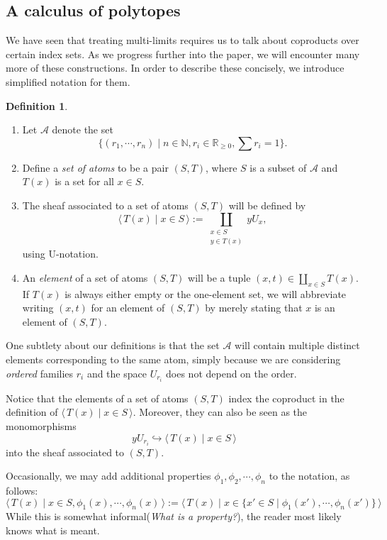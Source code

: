 \documentclass[a4paper]{amsproc}
\theoremstyle{plain}
\theoremstyle{definition}
\newtheorem{definition}[theorem]{Definition}
\theoremstyle{remark}
\numberwithin{equation}{section}
\newcommand{\y}{\textit{y}}
\newcommand{\la}{\langle\,}
\newcommand{\ra}{\,\rangle}
\begin{document}
\subsection{A calculus of polytopes}

We have seen that treating multi-limits requires us to talk about coproducts over certain index sets. As we progress further into the paper, we will encounter many more of these constructions. In order to describe these concisely, we introduce simplified notation for them.

\begin{definition}
    \mbox{}
    \begin{enumerate}
        \item Let $\mathcal{A}$ denote the set
        \[
            \{(r_1,\cdots, r_n) \mid n \in \mathbb{N}, r_i \in \mathbb{R}_{\geq 0}, \sum r_i = 1\}.
        \]
        \item Define a \emph{set of atoms} to be a pair $(S, T)$, where $S$ is a subset of $\mathcal{A}$ and $T(x)$ is a set for all $x \in S$.
        \item The sheaf associated to a set of atoms $(S,T)$ will be defined by
        \[
            \la T(x) \mid x \in S \ra := \coprod_{\substack{x \in S \\ y \in T(x)}} \y U_x ,
        \]
        using U-notation.
        \item An \emph{element} of a set of atoms $(S,T)$ will be a tuple $(x,t) \in \coprod_{x \in S} T(x)$. If $T(x)$ is always either empty or the one-element set, we will abbreviate writing $(x,t)$ for an element of $(S,T)$ by merely stating that $x$ is an element of $(S,T)$.
    \end{enumerate}
\end{definition}

One subtlety about our definitions is that the set $\mathcal{A}$ will contain multiple distinct elements corresponding to the same atom, simply because we are considering \emph{ordered} families $r_i$ and the space $U_{r_i}$ does not depend on the order.

Notice that the elements of a set of atoms $(S,T)$ index the coproduct in the definition of $\la T(x) \mid x \in S \ra$. Moreover, they can also be seen as the monomorphisms
\[
    \y U_{r_i} \hookrightarrow \la T(x) \mid x \in S \ra
\]
into the sheaf associated to $(S,T)$.

Occasionally, we may add additional properties $\phi_1, \phi_2, \cdots, \phi_n$ to the notation, as follows:
\[
    \la T(x) \mid x \in S, \phi_1(x), \cdots, \phi_n(x) \ra := \la T(x) \mid x \in \{x' \in S \mid \phi_1(x'), \cdots, \phi_n(x')\} \ra
\]
While this is somewhat informal(\emph{What is a property?}), the reader most likely knows what is meant.
\end{document}
